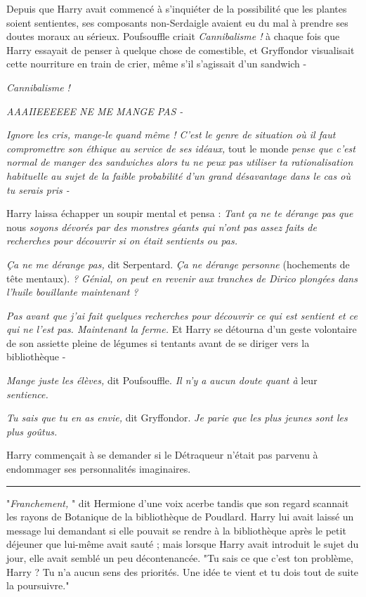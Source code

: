 Depuis que Harry avait commencé à s'inquiéter de la possibilité que les plantes soient sentientes, ses composants non-Serdaigle avaient eu du mal à prendre ses doutes moraux au sérieux. Poufsouffle criait \emph{Cannibalisme ! } à chaque fois que Harry essayait de penser à quelque chose de comestible, et Gryffondor visualisait cette nourriture en train de crier, même s'il s'agissait d'un sandwich -

\emph{Cannibalisme !} 

\emph{AAAIIEEEEEE NE ME MANGE PAS -} 

\emph{Ignore les cris, mange-le quand même ! C'est le genre de situation où il faut compromettre son éthique au service de ses idéaux, } tout le monde \emph{pense que c'est normal de manger des sandwiches alors tu ne peux pas utiliser ta rationalisation habituelle au sujet de la faible probabilité d'un grand désavantage dans le cas où tu serais pris -} 

Harry laissa échapper un soupir mental et pensa : \emph{Tant ça ne te dérange pas que } nous\emph{ soyons dévorés par des monstres géants qui n'ont pas assez faits de recherches pour découvrir si on était sentients ou pas.} 

\emph{Ça ne me dérange pas, } dit Serpentard. \emph{Ça ne dérange personne } (hochements de tête mentaux). \emph{? Génial, on peut en revenir aux tranches de Dirico plongées dans l'huile bouillante maintenant ?} 

\emph{Pas avant que j'ai fait quelques recherches pour découvrir ce qui est sentient et ce qui ne l'est pas. Maintenant la ferme. } Et Harry se détourna d'un geste volontaire de son assiette pleine de légumes si tentants avant de se diriger vers la bibliothèque -

\emph{Mange juste les élèves,}  dit Poufsouffle. \emph{Il n'y a aucun doute quant à } leur\emph{ sentience.} 

\emph{Tu sais que tu en as envie, } dit Gryffondor. \emph{Je parie que les plus jeunes sont les plus goûtus.} 

Harry commençait à se demander si le Détraqueur n'était pas parvenu à endommager ses personnalités imaginaires.
\par\noindent\rule{\textwidth}{0.4pt}
"\emph{Franchement,} " dit Hermione d'une voix acerbe tandis que son regard scannait les rayons de Botanique de la bibliothèque de Poudlard. Harry lui avait laissé un message lui demandant si elle pouvait se rendre à la bibliothèque après le petit déjeuner que lui-même avait sauté ; mais lorsque Harry avait introduit le sujet du jour, elle avait semblé un peu décontenancée. "Tu sais ce que c'est ton problème, Harry ? Tu n'a aucun sens des priorités. Une idée te vient et tu dois tout de suite la poursuivre."

